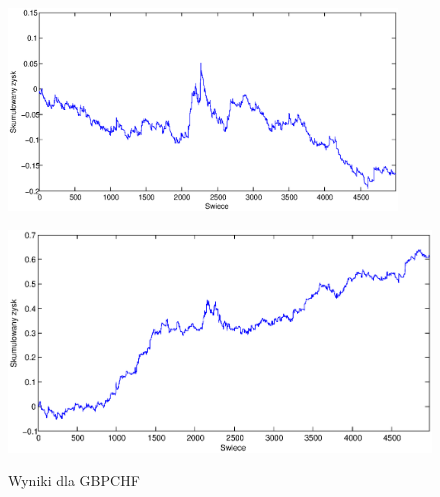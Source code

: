 \begin{figure}[h]
\begin{minipage}{.49\linewidth}
\label{cztero}
\end{minipage}
\begin{minipage}{.49\linewidth}
\centering
\includegraphics[width=0.92\textwidth]{images/S1d_gbpchf.eps}
\label{mansard}
\end{minipage}
\begin{minipage}{\linewidth}
\centering
\includegraphics[width=\textwidth]{images/S1s_gbpchf.eps}
\label{mansard}
\end{minipage}
\caption{Wyniki dla GBPCHF}
\end{figure}
\FloatBarrier
